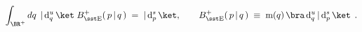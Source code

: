 \begin{equation}
\int_{\BR^+}dq \;\,|\,{\rm d}_{q}^u\,\ket\;B_{\rm\sst E}^{+}(\,p\,|\,q\,)\;
=\; |\,{\rm d}_{p}^s\,\ket,\qquad
B_{\rm\sst E}^{+}(\,p\,|\,q\,)\;\equiv\; {\rm m}(q)\,
\bra\,{\rm d}_q^u\,|\,{\rm d}_p^s\,\ket\;\, .
\end{equation}

